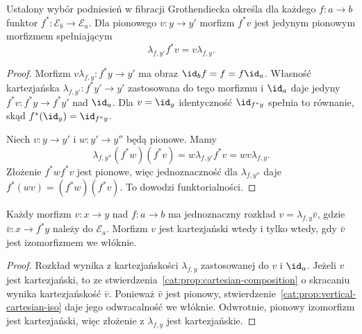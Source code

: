\begin{stwierdzenie}\label{cat:prop:cartesian-reindexing}
Ustalony wybór podniesień w fibracji Grothendiecka określa dla każdego $f:a\to b$ funktor $f^*:\mathcal E_b\to\mathcal E_a$. Dla pionowego $v:y\to y'$ morfizm $f^*v$ jest jedynym pionowym morfizmem spełniającym
\[
 \lambda_{f,y'}f^*v=v\lambda_{f,y}.
\]
\end{stwierdzenie}
\begin{proof}
Morfizm $v\lambda_{f,y}:f^*y\to y'$ ma obraz $\id_b f=f=f\id_a$. Własność kartezjańska $\lambda_{f,y'}:f^*y'\to y'$ zastosowana do tego morfizmu i $\id_a$ daje jedyny $f^*v:f^*y\to f^*y'$ nad $\id_a$. Dla $v=\id_y$ identyczność $\id_{f^*y}$ spełnia to równanie, skąd $f^*(\id_y)=\id_{f^*y}$.

Niech $v:y\to y'$ i $w:y'\to y''$ będą pionowe. Mamy
\[
 \lambda_{f,y''}(f^*w)(f^*v)
 =w\lambda_{f,y'}f^*v
 =wv\lambda_{f,y}.
\]
Złożenie $f^*w f^*v$ jest pionowe, więc jednoznaczność dla $\lambda_{f,y''}$ daje $f^*(wv)=(f^*w)(f^*v)$. To dowodzi funktorialności.
\end{proof}

\begin{stwierdzenie}\label{cat:prop:cartesian-vertical-factor}
Każdy morfizm $v:x\to y$ nad $f:a\to b$ ma jednoznaczny rozkład $v=\lambda_{f,y}\bar v$, gdzie $\bar v:x\to f^*y$ należy do $\mathcal E_a$. Morfizm $v$ jest kartezjański wtedy i tylko wtedy, gdy $\bar v$ jest izomorfizmem we włóknie.
\end{stwierdzenie}
\begin{proof}
Rozkład wynika z kartezjańskości $\lambda_{f,y}$ zastosowanej do $v$ i $\id_a$. Jeżeli $v$ jest kartezjański, to ze stwierdzenia~\ref{cat:prop:cartesian-composition} o skracaniu wynika kartezjańskość $\bar v$. Ponieważ $\bar v$ jest pionowy, stwierdzenie~\ref{cat:prop:vertical-cartesian-iso} daje jego odwracalność we włóknie. Odwrotnie, pionowy izomorfizm jest kartezjański, więc złożenie z $\lambda_{f,y}$ jest kartezjańskie.
\end{proof}

